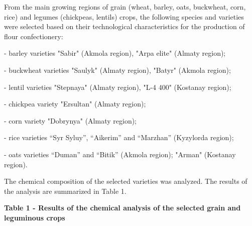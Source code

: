 From the main growing regions of grain (wheat, barley, oats, buckwheat,
corn, rice) and legumes (chickpeas, lentils) crops, the following
species and varieties were selected based on their technological
characteristics for the production of flour confectionery:

- barley varieties "Sabir" (Akmola region), "Arpa elite" (Almaty
region);

- buckwheat varieties "Saulyk" (Almaty region), "Batyr" (Akmola region);

- lentil varieties "Stepnaya" (Almaty region), "L-4 400" (Kostanay
region);

- chickpea variety "Ersultan" (Almaty region);

- corn variety "Dobrynya" (Almaty region);

- rice varieties ``Syr Syluy'', ``Aikerim'' and ``Marzhan'' (Kyzylorda
region);

- oats varieties ``Duman'' and ``Bitik'' (Akmola region); "Arman"
(Kostanay region).

The chemical composition of the selected varieties was analyzed. The
results of the analysis are summarized in Table 1.

{\bfseries Table 1 - Results of the chemical analysis of the selected grain
and leguminous crops}

